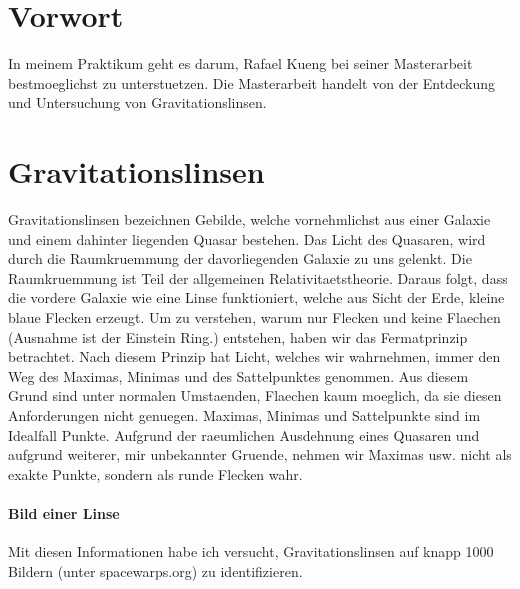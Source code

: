 \documentclass[pdftex,12pt,a4paper]{article}
\begin{document}



\tableofcontents
\setcounter{tocdepth}{3}
\newpage

\section{Vorwort}

In meinem Praktikum geht es darum, Rafael Kueng bei seiner Masterarbeit bestmoeglichst zu unterstuetzen.
Die Masterarbeit handelt von der Entdeckung und Untersuchung von Gravitationslinsen.

\section {Gravitationslinsen}

Gravitationslinsen bezeichnen Gebilde, welche vornehmlichst aus einer Galaxie und einem dahinter liegenden Quasar bestehen.
Das Licht des Quasaren, wird durch die Raumkruemmung der davorliegenden Galaxie zu uns gelenkt.
Die Raumkruemmung ist Teil der allgemeinen Relativitaetstheorie.
Daraus folgt, dass die vordere Galaxie wie eine Linse funktioniert, welche aus Sicht der Erde, kleine blaue Flecken erzeugt.
Um zu verstehen, warum nur Flecken und keine Flaechen (Ausnahme ist der Einstein Ring.) entstehen, haben wir das Fermatprinzip betrachtet.
Nach diesem Prinzip hat Licht, welches wir wahrnehmen, immer den Weg des Maximas, Minimas und des Sattelpunktes genommen.
Aus diesem Grund sind unter normalen Umstaenden, Flaechen kaum moeglich, da sie diesen Anforderungen nicht genuegen.
Maximas, Minimas und Sattelpunkte sind im Idealfall Punkte. Aufgrund der raeumlichen Ausdehnung eines Quasaren und aufgrund weiterer,
mir unbekannter Gruende, nehmen wir Maximas usw. nicht als exakte Punkte, sondern als runde Flecken wahr. 

\paragraph{Bild einer Linse}

Mit diesen Informationen habe ich versucht, Gravitationslinsen auf knapp 1000 Bildern (unter spacewarps.org) zu identifizieren.
\end{document}
